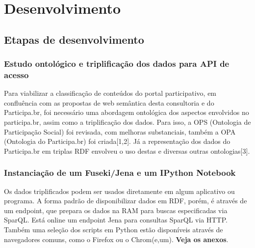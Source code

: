 \documentclass[12pt]{article}
\begin{document}
\section{Desenvolvimento}
\subsection{Etapas de desenvolvimento}
\subsubsection{Estudo ontológico e triplificação dos dados para API de acesso}
Para viabilizar a classificação de conteúdos do portal participativo, em confluência com as propostas de web semântica desta consultoria e do Participa.br, foi necessário uma abordagem ontológica dos aspectos envolvidos no participa.br, assim como a triplificação dos dados. Para isso, a OPS (Ontologia de Participação Social) foi revisada, com melhoras substanciais, também a OPA (Ontologia do Participa.br) foi criada[1,2]. Já a representação dos dados do Participa.br em triplas RDF envolveu o uso destas e diversas outras ontologias[3].
\subsubsection{Instanciação de um Fuseki/Jena e um IPython Notebook}
Os dados triplificados podem ser usados diretamente em algum aplicativo ou programa. A forma padrão de disponibilizar dados em RDF, porém, é através de um endpoint, que prepara os dados na RAM para buscas especificadas via SparQL. Está online um endpoint Jena para consultas SparQL via HTTP. Também uma seleção dos scripts em Python estão disponíveis através de navegadores comuns, como o Firefox ou o Chrom(e,um). {\bf Veja os anexos}.
\end{document}
